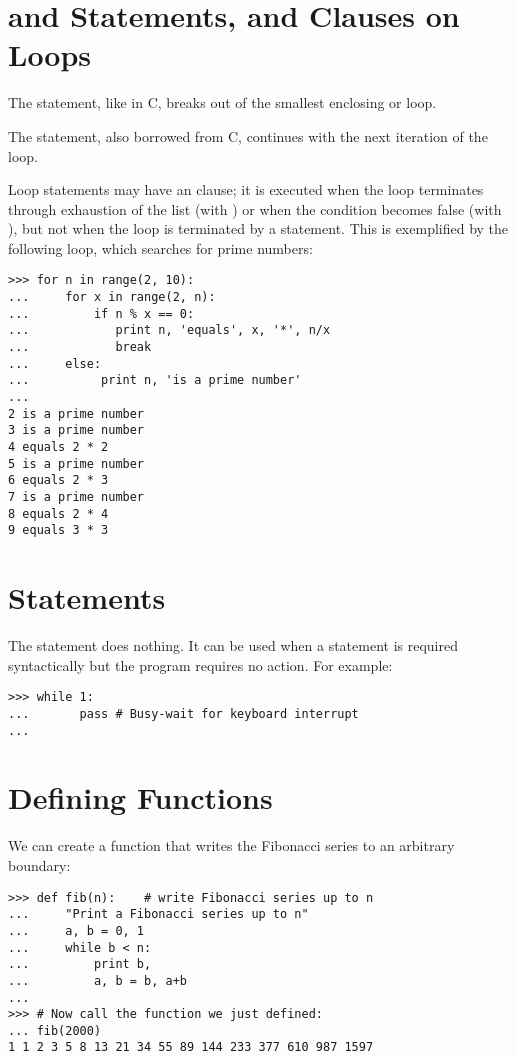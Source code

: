 \documentclass{manual}
\begin{document}
\section{ and  Statements, and
          Clauses on Loops
         \label{break}}

The  statement, like in C, breaks out of the smallest
enclosing  or  loop.

The  statement, also borrowed from C, continues
with the next iteration of the loop.

Loop statements may have an  clause; it is executed when
the loop terminates through exhaustion of the list (with
) or when the condition becomes false (with
), but not when the loop is terminated by a
 statement.  This is exemplified by the following loop,
which searches for prime numbers:

\begin{verbatim}
>>> for n in range(2, 10):
...     for x in range(2, n):
...         if n % x == 0:
...            print n, 'equals', x, '*', n/x
...            break
...     else:
...          print n, 'is a prime number'
... 
2 is a prime number
3 is a prime number
4 equals 2 * 2
5 is a prime number
6 equals 2 * 3
7 is a prime number
8 equals 2 * 4
9 equals 3 * 3
\end{verbatim}

\section{ Statements \label{pass}}

The  statement does nothing.
It can be used when a statement is required syntactically but the
program requires no action.
For example:

\begin{verbatim}
>>> while 1:
...       pass # Busy-wait for keyboard interrupt
... 
\end{verbatim}

\section{Defining Functions \label{functions}}

We can create a function that writes the Fibonacci series to an
arbitrary boundary:

\begin{verbatim}
>>> def fib(n):    # write Fibonacci series up to n
...     "Print a Fibonacci series up to n"
...     a, b = 0, 1
...     while b < n:
...         print b,
...         a, b = b, a+b
... 
>>> # Now call the function we just defined:
... fib(2000)
1 1 2 3 5 8 13 21 34 55 89 144 233 377 610 987 1597
\end{verbatim}
\end{document}
